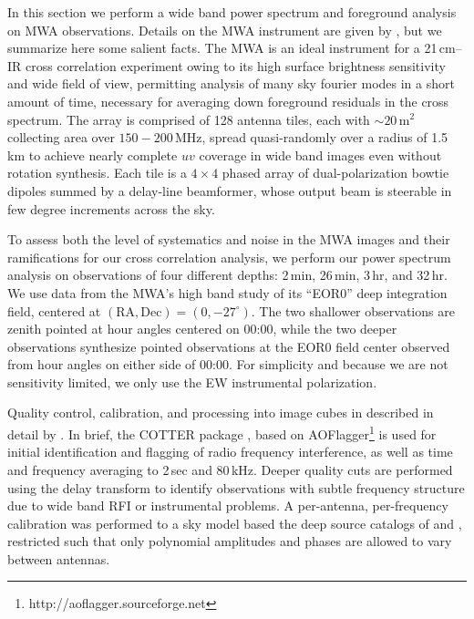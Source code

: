 \documentclass[preprint]{aastex}
\begin{document}
In this section we perform a wide band power spectrum and foreground analysis on MWA observations. Details on the MWA instrument are given by \citet{tingay13}, but we summarize here some salient facts. The MWA is an ideal instrument for a 21\,cm--IR cross correlation experiment owing to its high surface brightness sensitivity and wide field of view, permitting analysis of many sky fourier modes in a short amount of time, necessary for averaging down foreground residuals in the cross spectrum. The array is comprised of 128 antenna tiles, each with $\sim20\,\text{m}^2$ collecting area over $150-200\,$MHz, spread quasi-randomly over a radius of 1.5\,km to achieve nearly complete $uv$ coverage in wide band images even without rotation synthesis. Each tile is a $4\times4$ phased array of dual-polarization bowtie dipoles summed by a delay-line beamformer, whose output beam is steerable in few degree increments across the sky. 

To assess both the level of systematics and noise in the MWA images and their ramifications for our cross correlation analysis, we perform our power spectrum analysis on observations of four different depths: 2\,min, 26\,min, 3\,hr, and 32\,hr. We use data from the MWA's high band study of its ``EOR0'' deep integration field, centered at $(\text{RA}, \text{Dec})=(0,-27^\circ)$. The two shallower observations are zenith pointed at hour angles centered on 00:00, while the two deeper observations synthesize pointed observations at the EOR0 field center observed from hour angles on either side of 00:00. For simplicity and because we are not sensitivity limited, we only use the EW instrumental polarization.

Quality control, calibration, and processing into image cubes in described in detail by \citet{beardsley16}. In brief, the COTTER package \citep{AndreMWARFI}, based on AOFlagger\footnote{http://aoflagger.sourceforge.net} \citep{aoflagger} is used for initial identification and flagging of radio frequency interference, as well as time and frequency averaging to 2\,sec and 80\,kHz. Deeper quality cuts are performed using the delay transform \citep{parsons12b} to identify observations with subtle frequency structure due to wide band RFI or instrumental problems. A per-antenna, per-frequency calibration was performed to a sky model based the deep source catalogs of \citet{PattiCatalog1} and \citet{mwacs}, restricted such that only polynomial amplitudes and phases are allowed to vary between antennas. 
\end{document}
